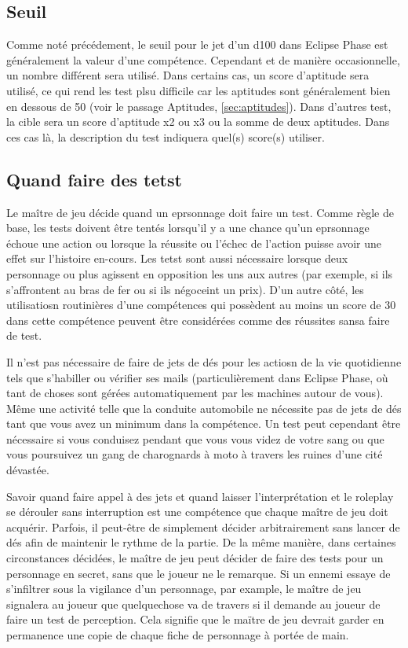 \subsection{Seuil} \label{sec:target-numbers} 

Comme noté précédement, le seuil pour le jet d'un d100 dans Eclipse Phase est généralement la valeur d'une compétence. Cependant et de manière occasionnelle, un nombre différent sera utilisé. Dans certains cas, un score d'aptitude sera utilisé, ce qui rend les test plsu difficile car les aptitudes sont généralement bien en dessous de 50 (voir le passage Aptitudes, \ref{sec:aptitudes}). Dans d'autres test, la cible sera un score d'aptitude x2 ou x3 ou la somme de deux aptitudes. Dans ces cas là, la description du test indiquera quel(s) score(s) utiliser. 

\subsection{Quand faire des tetst} \label{sec:when-make-tests} 

Le maître de jeu décide quand un eprsonnage doit faire un test. Comme règle de base, les tests doivent être tentés lorsqu'il y a une chance qu'un eprsonnage échoue une action ou lorsque la réussite ou l'échec de l'action puisse avoir une effet sur l'histoire en-cours. Les tetst sont aussi nécessaire lorsque deux personnage ou plus agissent en opposition les uns aux autres (par exemple, si ils s'affrontent au bras de fer ou si ils négoceint un prix). D'un autre côté, les utilisatiosn routinières d'une compétences qui possèdent au moins un score de 30 dans cette compétence peuvent être considérées comme des réussites sansa faire de test. 

Il n'est pas nécessaire de faire de jets de dés pour les actiosn de la vie quotidienne tels que s'habiller ou vérifier ses mails (particulièrement dans Eclipse Phase, où tant de choses sont gérées automatiquement par les machines autour de vous). Même une activité telle que la conduite automobile ne nécessite pas de jets de dés tant que vous avez un minimum dans la compétence. Un test peut cependant être nécessaire si vous conduisez pendant que vous vous videz de votre sang ou que vous poursuivez un gang de charognards à moto à travers les ruines d'une cité dévastée. 

Savoir quand faire appel à des jets et quand laisser l'interprétation et le roleplay se dérouler sans interruption est une compétence que chaque maître de jeu doit acquérir. Parfois, il peut-être de simplement décider arbitrairement sans lancer de dés afin de maintenir le rythme de la partie. De la même manière, dans certaines circonstances décidées, le maître de jeu peut décider de faire des tests pour un personnage en secret, sans que le joueur ne le remarque. Si un ennemi essaye de s'infiltrer sous la vigilance d'un personnage, par example, le maître de jeu signalera au joueur que quelquechose va de travers si il demande au joueur de faire un test de perception. Cela signifie que le maïtre de jeu devrait garder en permanence une copie de chaque fiche de personnage à portée de main. 

